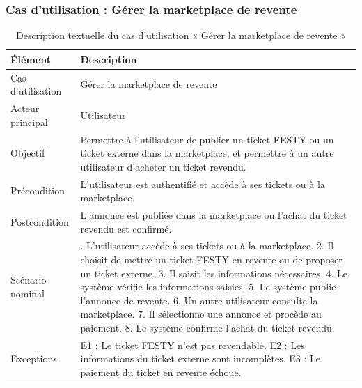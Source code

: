 \subsubsection{Cas d’utilisation : Gérer la marketplace de revente}


\begin{table}[H]
\centering
\caption{Description textuelle du cas d’utilisation « Gérer la marketplace de revente »}
\label{tableau:6-3}
\renewcommand{\arraystretch}{1.2}
\begin{tabularx}{\textwidth}{|>{\raggedright\arraybackslash}X|>{\raggedright\arraybackslash}X|}
\hline
\rowcolor[HTML]{ECF4FF}
\textbf{Élément} & \textbf{Description} \\
\hline
Cas d’utilisation & Gérer la marketplace de revente \\
\hline
Acteur principal & Utilisateur \\
\hline
Objectif & Permettre à l’utilisateur de publier un ticket FESTY ou un ticket externe dans la marketplace, et permettre à un autre utilisateur d’acheter un ticket revendu. \\
\hline
Précondition & L’utilisateur est authentifié et accède à ses tickets ou à la marketplace. \\
\hline
Postcondition & L’annonce est publiée dans la marketplace ou l’achat du ticket revendu est confirmé. \\
\hline
Scénario nominal & 1. L’utilisateur accède à ses tickets ou à la marketplace.\newline{} 2. Il choisit de mettre un ticket FESTY en revente ou de proposer un ticket externe.\newline{} 3. Il saisit les informations nécessaires.\newline{} 4. Le système vérifie les informations saisies.\newline{} 5. Le système publie l’annonce de revente.\newline{} 6. Un autre utilisateur consulte la marketplace.\newline{} 7. Il sélectionne une annonce et procède au paiement.\newline{} 8. Le système confirme l’achat du ticket revendu. \\
\hline
Exceptions & E1 : Le ticket FESTY n’est pas revendable.\newline{} E2 : Les informations du ticket externe sont incomplètes.\newline{} E3 : Le paiement du ticket en revente échoue. \\
\hline
\end{tabularx}
\end{table}


